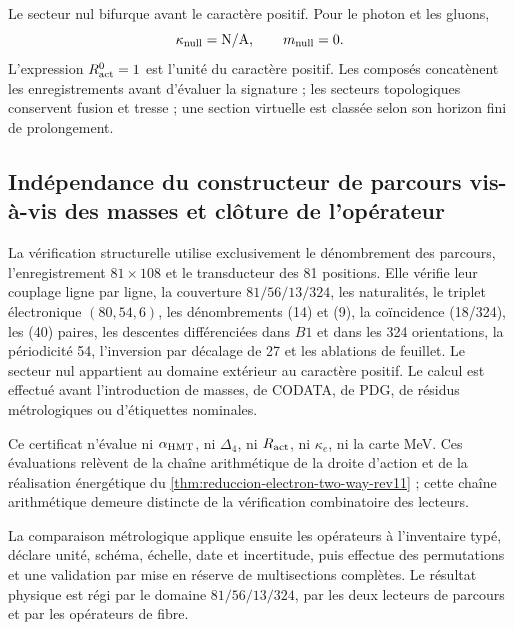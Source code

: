 Le secteur nul bifurque avant le caractère positif. Pour le photon et les gluons,
\[
 \kappa_{\rm null}=\mathrm{N/A},
 \qquad m_{\rm null}=0.
\]
L'expression \(R_{\rm act}^{0}=1\) est l'unité du caractère positif. Les
composés concatènent les
enregistrements avant d'évaluer la signature ; les secteurs topologiques conservent fusion et
tresse ; une section virtuelle est classée selon son horizon fini de
prolongement.

\subsection{Indépendance du constructeur de parcours vis-à-vis des masses et clôture de l'opérateur}

La vérification structurelle utilise exclusivement le dénombrement des parcours,
l'enregistrement \(81\times108\) et le transducteur des 81 positions. Elle vérifie leur
couplage ligne par ligne, la couverture
\(81/56/13/324\), les naturalités, le triplet électronique \((80,54,6)\), les
dénombrements (14) et (9), la coïncidence (18/324), les
(40) paires, les descentes différenciées dans \(B1\) et dans les 324 orientations,
la périodicité 54, l'inversion par décalage de 27 et les ablations de feuillet. Le
secteur nul appartient au domaine extérieur au caractère positif. Le calcul est
effectué avant l'introduction de masses, de CODATA, de PDG, de résidus métrologiques ou
d'étiquettes nominales.

Ce certificat n'évalue ni \(\alpha_{\rm HMT}\), ni \(\Delta_4\),
ni \(R_{\rm act}\), ni \(\kappa_e\), ni la carte MeV. Ces évaluations relèvent de
la chaîne arithmétique de la droite d'action et de la réalisation énergétique du
\cref{thm:reduccion-electron-two-way-rev11} ; cette chaîne arithmétique demeure
distincte de la vérification combinatoire des lecteurs.

La comparaison métrologique applique ensuite les opérateurs à l'inventaire typé,
déclare unité, schéma, échelle, date et incertitude, puis effectue des permutations
et une validation par mise en réserve de multisections complètes. Le résultat physique est
régi par le domaine \(81/56/13/324\), par les deux lecteurs de parcours et par
les opérateurs de fibre.

